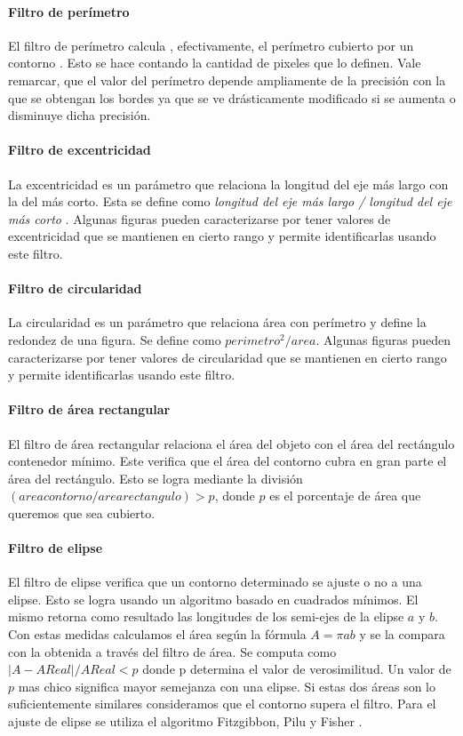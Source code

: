	\paragraph{Filtro de per\'imetro}
	El filtro de per\'imetro calcula , efectivamente, el per\'imetro 
	cubierto por un contorno . Esto se hace contando la cantidad de pixeles que lo definen.
	Vale remarcar, que el valor del per\'imetro depende ampliamente de la precisi\'on con la que se obtengan los bordes ya que se ve dr\'asticamente modificado 
	si se aumenta o disminuye dicha precisi\'on.
	\paragraph{Filtro de excentricidad}
	La excentricidad es un par\'ametro que relaciona la longitud del eje 
	m\'as largo con la del m\'as corto. Esta se define como 
	\textit { longitud del eje m\'as largo / longitud del eje m\'as corto}  . Algunas figuras pueden caracterizarse por tener valores de excentricidad
	que se mantienen en cierto rango y permite identificarlas usando este filtro.
	\paragraph{Filtro de circularidad}
	La circularidad es un par\'ametro que relaciona \'area con per\'imetro y define la redondez de una figura. Se define como $perimetro^2/area$. Algunas figuras pueden 
	caracterizarse por tener valores de circularidad que se mantienen en cierto rango y permite identificarlas usando este filtro.
	\paragraph{Filtro de \'area rectangular}
	El filtro de \'area rectangular relaciona el \'area del objeto con el \'area del rect\'angulo contenedor m\'inimo. Este verifica que el \'area
	del contorno cubra en gran parte el \'area del rect\'angulo. Esto se logra mediante la divisi\'on $(area contorno / area rectangulo)> p$, donde 
	$p$ es el porcentaje de \'area que queremos que sea cubierto.
	\paragraph{Filtro de elipse}
	El filtro de elipse verifica que un contorno determinado se ajuste o no a una elipse. Esto se logra usando un algoritmo basado 
	en cuadrados m\'inimos. El mismo retorna como resultado las longitudes de los semi-ejes de la elipse $a$ y $b$. Con estas medidas calculamos
	el \'area seg\'un la f\'ormula $A=\pi a  b$ y se la compara con la 
	obtenida a trav\'es del filtro de \'area. Se computa como $|A-AReal|/ 
	AReal < p$ donde p determina el
	valor de verosimilitud. Un valor de $p$ mas chico significa mayor 
	semejanza con una elipse. Si estas dos \'areas son lo suficientemente similares consideramos que el contorno supera el filtro. 
	Para el ajuste de elipse se utiliza el algoritmo Fitzgibbon, Pilu y Fisher \cite{Fitzgibbon99}.
